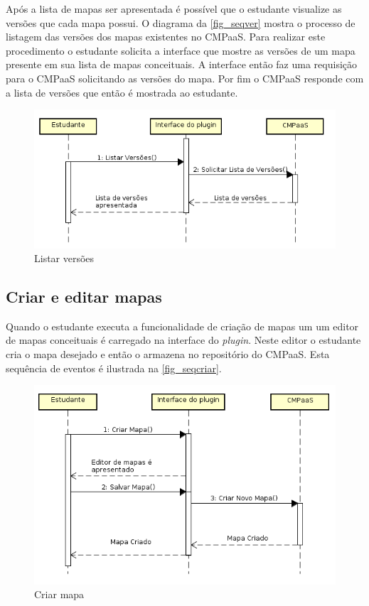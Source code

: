 \documentclass[
	12pt,				%
	openright,			%
	oneside,			%
	a4paper,			%
	english,			%
	french,				%
	spanish,			%
	brazil				%
	]{abntex2}
\begin{document}
Após a lista de mapas ser apresentada é possível que o estudante visualize as versões que cada mapa possui. O diagrama da \autoref{fig_seqver} mostra o processo de listagem das versões dos mapas existentes no CMPaaS. Para realizar este procedimento o estudante solicita a interface que mostre as versões de um mapa presente em sua lista de mapas conceituais. A interface então faz uma requisição para o CMPaaS solicitando as versões do mapa. Por fim o CMPaaS responde com a lista de versões que então é mostrada ao estudante.   

\begin{figure}[htb]
	\caption{\label{fig_seqver} Listar versões}
	\begin{center}
		\includegraphics[scale=0.4]{seqver.png}
	\end{center}
\end{figure}



\subsection{Criar e editar mapas}

Quando o estudante executa a funcionalidade de criação de mapas um um editor de mapas conceituais é carregado na interface do \textit{plugin}. Neste editor o estudante cria o mapa desejado e então o armazena no repositório do CMPaaS. Esta sequência de eventos é ilustrada na \autoref{fig_seqcriar}.

\begin{figure}[htb]
	\caption{\label{fig_seqcriar} Criar mapa}
	\begin{center}
		\includegraphics[scale=0.5]{seqcriar.png}
	\end{center}
\end{figure}
\end{document}
